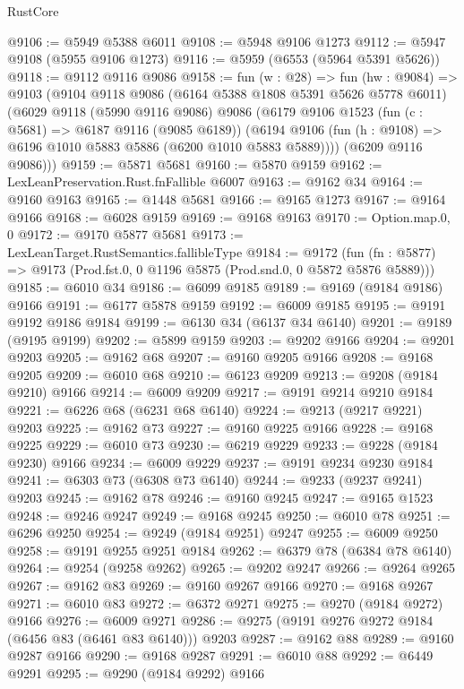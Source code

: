 \begin{lexlean}{RustCore}
\begin{coremodule}
@9106 := @5949 @5388 @6011
@9108 := @5948 @9106 @1273
@9112 := @5947 @9108 (@5955 @9106 @1273)
@9116 := @5959 (@6553 (@5964 @5391 @5626))
@9118 := @9112 @9116 @9086
@9158 := fun (w : @28) =>
  fun (hw : @9084) =>
  @9103
    (@9104
      @9118
      @9086
      (@6164 @5388 @1808 @5391 @5626 @5778 @6011)
      (@6029
        @9118
        (@5990 @9116 @9086)
        @9086
        (@6179
          @9106
          @1523
          (fun (c : @5681) => @6187 @9116 (@9085 @6189))
          (@6194 @9106 (fun (h : @9108) => @6196 @1010 @5883 @5886 (@6200 @1010 @5883 @5889))))
        (@6209 @9116 @9086)))
@9159 := @5871 @5681
@9160 := @5870 @9159
@9162 := LexLeanPreservation.Rust.fnFallible @6007
@9163 := @9162 @34
@9164 := @9160 @9163
@9165 := @1448 @5681
@9166 := @9165 @1273
@9167 := @9164 @9166
@9168 := @6028 @9159
@9169 := @9168 @9163
@9170 := Option.map.{0, 0}
@9172 := @9170 @5877 @5681
@9173 := LexLeanTarget.RustSemantics.fallibleType
@9184 := @9172
    (fun (fn : @5877) => @9173 (Prod.fst.{0, 0} @1196 @5875 (Prod.snd.{0, 0} @5872 @5876 @5889)))
@9185 := @6010 @34
@9186 := @6099 @9185
@9189 := @9169 (@9184 @9186) @9166
@9191 := @6177 @5878 @9159
@9192 := @6009 @9185
@9195 := @9191 @9192 @9186 @9184
@9199 := @6130 @34 (@6137 @34 @6140)
@9201 := @9189 (@9195 @9199)
@9202 := @5899 @9159
@9203 := @9202 @9166
@9204 := @9201 @9203
@9205 := @9162 @68
@9207 := @9160 @9205 @9166
@9208 := @9168 @9205
@9209 := @6010 @68
@9210 := @6123 @9209
@9213 := @9208 (@9184 @9210) @9166
@9214 := @6009 @9209
@9217 := @9191 @9214 @9210 @9184
@9221 := @6226 @68 (@6231 @68 @6140)
@9224 := @9213 (@9217 @9221) @9203
@9225 := @9162 @73
@9227 := @9160 @9225 @9166
@9228 := @9168 @9225
@9229 := @6010 @73
@9230 := @6219 @9229
@9233 := @9228 (@9184 @9230) @9166
@9234 := @6009 @9229
@9237 := @9191 @9234 @9230 @9184
@9241 := @6303 @73 (@6308 @73 @6140)
@9244 := @9233 (@9237 @9241) @9203
@9245 := @9162 @78
@9246 := @9160 @9245
@9247 := @9165 @1523
@9248 := @9246 @9247
@9249 := @9168 @9245
@9250 := @6010 @78
@9251 := @6296 @9250
@9254 := @9249 (@9184 @9251) @9247
@9255 := @6009 @9250
@9258 := @9191 @9255 @9251 @9184
@9262 := @6379 @78 (@6384 @78 @6140)
@9264 := @9254 (@9258 @9262)
@9265 := @9202 @9247
@9266 := @9264 @9265
@9267 := @9162 @83
@9269 := @9160 @9267 @9166
@9270 := @9168 @9267
@9271 := @6010 @83
@9272 := @6372 @9271
@9275 := @9270 (@9184 @9272) @9166
@9276 := @6009 @9271
@9286 := @9275 (@9191 @9276 @9272 @9184 (@6456 @83 (@6461 @83 @6140))) @9203
@9287 := @9162 @88
@9289 := @9160 @9287 @9166
@9290 := @9168 @9287
@9291 := @6010 @88
@9292 := @6449 @9291
@9295 := @9290 (@9184 @9292) @9166

\end{coremodule}
\end{lexlean}
